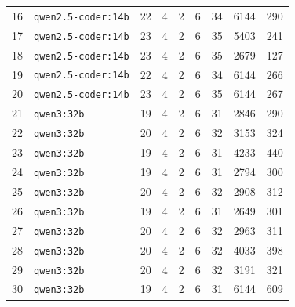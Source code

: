 \begin{table}[htbp]
{\begin{tabular}{|c|l|c|c|c|c|c|c|c|}
16 & \texttt{qwen2.5-coder:14b}    & 22 & 4 & 2 & 6 & 34 &  6144 &  290 \\
17 & \texttt{qwen2.5-coder:14b}    & 23 & 4 & 2 & 6 & 35 &  5403 &  241 \\
18 & \texttt{qwen2.5-coder:14b}    & 23 & 4 & 2 & 6 & 35 &  2679 &  127 \\
19 & \texttt{qwen2.5-coder:14b}    & 22 & 4 & 2 & 6 & 34 &  6144 &  266 \\
20 & \texttt{qwen2.5-coder:14b}    & 23 & 4 & 2 & 6 & 35 &  6144 &  267 \\
\hline
21 & \texttt{qwen3:32b}            & 19 & 4 & 2 & 6 & 31 &  2846 &  290 \\
22 & \texttt{qwen3:32b}            & 20 & 4 & 2 & 6 & 32 &  3153 &  324 \\
23 & \texttt{qwen3:32b}            & 19 & 4 & 2 & 6 & 31 &  4233 &  440 \\
24 & \texttt{qwen3:32b}            & 19 & 4 & 2 & 6 & 31 &  2794 &  300 \\
25 & \texttt{qwen3:32b}            & 20 & 4 & 2 & 6 & 32 &  2908 &  312 \\
26 & \texttt{qwen3:32b}            & 19 & 4 & 2 & 6 & 31 &  2649 &  301 \\
27 & \texttt{qwen3:32b}            & 20 & 4 & 2 & 6 & 32 &  2963 &  311 \\
28 & \texttt{qwen3:32b}            & 20 & 4 & 2 & 6 & 32 &  4033 &  398 \\
29 & \texttt{qwen3:32b}            & 20 & 4 & 2 & 6 & 32 &  3191 &  321 \\
30 & \texttt{qwen3:32b}            & 19 & 4 & 2 & 6 & 31 &  6144 &  609 \\
\hline
\end{tabular}
}%
\label{tab:rohdaten_runs}
\end{table}

\clearpage

\label{app:modell_summary_12}

